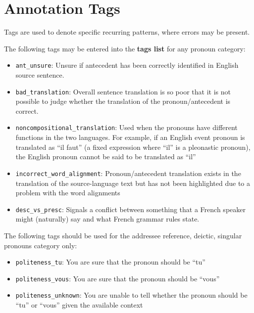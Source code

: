 \documentclass[11pt]{article} %
\newcommand\tag[1]{\texttt{#1}}
\begin{document}
\section{Annotation Tags}
\label{Tags}
Tags are used to denote specific recurring patterns, where errors may be present.

The following tags may be entered into the \textbf{tags list} for any pronoun category:

\begin{itemize}
  \item \tag{ant\_unsure}: Unsure if antecedent has been correctly identified in English source sentence.
  \item \tag{bad\_translation}: Overall sentence translation is so poor that it is not possible to judge whether the translation of the pronoun/antecedent is correct.
  \item \tag{noncompositional\_translation}: Used when the pronouns have different functions in the two languages. For example, if an English event pronoun is translated as ``il faut'' (a fixed expression where ``il'' is a pleonastic pronoun), the English pronoun cannot be said to be translated as ``il''
  \item \tag{incorrect\_word\_alignment}: Pronoun/antecedent translation exists in the translation of the source-language text but has not been highlighted due to a problem with the word alignments
  \item \tag{desc\_vs\_presc}: Signals a conflict between something that a French speaker might (naturally) say and what French grammar rules state.
\end{itemize}  

The following tags should be used for the addressee reference, deictic, singular pronouns category only:

\begin{itemize}  
  \item \tag{politeness\_tu}: You are sure that the pronoun should be ``tu''
  \item \tag{politeness\_vous}: You are sure that the pronoun should be ``vous''
  \item \tag{politeness\_unknown}: You are unable to tell whether the pronoun should be ``tu'' or ``vous'' given the available context
\end{itemize}
\end{document}
